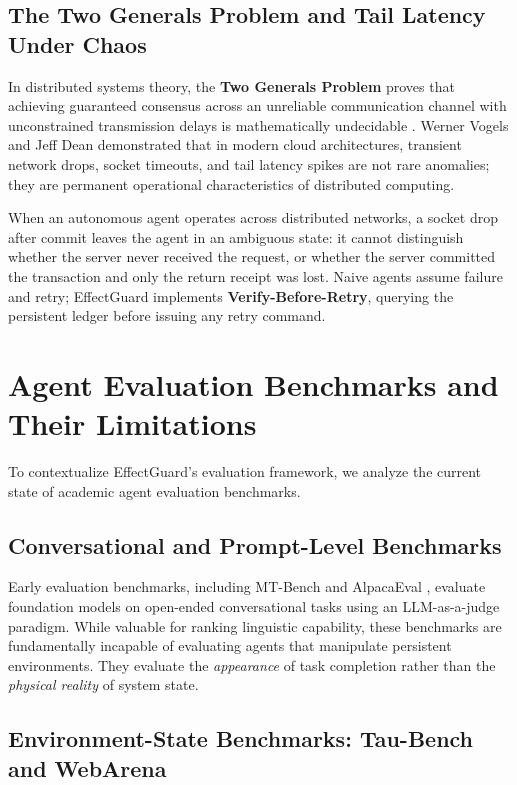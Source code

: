 \subsection{The Two Generals Problem and Tail Latency Under Chaos}

In distributed systems theory, the \textbf{Two Generals Problem} proves that achieving guaranteed consensus across an unreliable communication channel with unconstrained transmission delays is mathematically undecidable \cite{tanenbaum2007distributed}. Werner Vogels \cite{vogels2009eventually} and Jeff Dean \cite{dean2013tailatscale} demonstrated that in modern cloud architectures, transient network drops, socket timeouts, and tail latency spikes are not rare anomalies; they are permanent operational characteristics of distributed computing.

When an autonomous agent operates across distributed networks, a socket drop after commit leaves the agent in an ambiguous state: it cannot distinguish whether the server never received the request, or whether the server committed the transaction and only the return receipt was lost. Naive agents assume failure and retry; EffectGuard implements \textbf{Verify-Before-Retry}, querying the persistent ledger before issuing any retry command.

\section{Agent Evaluation Benchmarks and Their Limitations}

To contextualize EffectGuard's evaluation framework, we analyze the current state of academic agent evaluation benchmarks.

\subsection{Conversational and Prompt-Level Benchmarks}

Early evaluation benchmarks, including MT-Bench \cite{zheng2023judging} and AlpacaEval \cite{li2023alpacaeval}, evaluate foundation models on open-ended conversational tasks using an LLM-as-a-judge paradigm. While valuable for ranking linguistic capability, these benchmarks are fundamentally incapable of evaluating agents that manipulate persistent environments. They evaluate the \textit{appearance} of task completion rather than the \textit{physical reality} of system state.

\subsection{Environment-State Benchmarks: Tau-Bench and WebArena}

